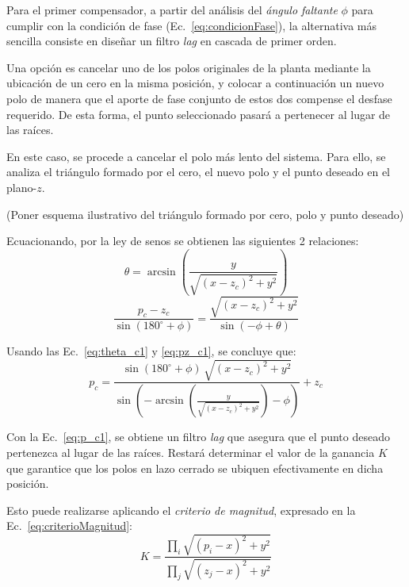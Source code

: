 Para el primer compensador, a partir del an\'alisis del \emph{ángulo faltante} $\phi$ para cumplir con la condici\'on de fase (Ec.~\eqref{eq:condicionFase}), la alternativa m\'as sencilla consiste en dise\~nar un filtro \emph{lag} en cascada de primer orden.  

Una opci\'on es cancelar uno de los polos originales de la planta mediante la ubicaci\'on de un cero en la misma posici\'on, y colocar a continuaci\'on un nuevo polo de manera que el aporte de fase conjunto de estos dos compense el desfase requerido. De esta forma, el punto seleccionado pasar\'a a pertenecer al lugar de las ra\'ices.  

En este caso, se procede a cancelar el polo m\'as lento del sistema. Para ello, se analiza el tri\'angulo formado por el cero, el nuevo polo y el punto deseado en el plano-$z$.  

(Poner esquema ilustrativo del tri\'angulo formado por cero, polo y punto deseado)  

Ecuacionando, por la ley de senos se obtienen las siguientes 2 relaciones:  
\begin{equation}
	\theta = \arcsin\!\left(\frac{y}{\sqrt{(x-z_c)^2+y^2}}\right)
	\label{eq:theta_c1}
\end{equation}
\begin{equation}
	\frac{p_c - z_c}{\sin(180^\circ+\phi)} 
	= \frac{\sqrt{(x-z_c)^2+y^2}}{\sin(-\phi+\theta)}
	\label{eq:pz_c1}
\end{equation}

Usando las Ec.~\eqref{eq:theta_c1} y \eqref{eq:pz_c1}, se concluye que:  
\begin{equation}
	p_c = 
	\frac{\sin(180^\circ+\phi)\,\sqrt{(x-z_c)^2+y^2}}
	{\sin\!\left(-\arcsin\!\left(\tfrac{y}{\sqrt{(x-z_c)^2+y^2}}\right)-\phi\right)}
	+ z_c
	\label{eq:p_c1}
\end{equation}

Con la Ec.~\eqref{eq:p_c1}, se obtiene un filtro \emph{lag} que asegura que el punto deseado pertenezca al lugar de las ra\'ices. Restar\'a determinar el valor de la ganancia $K$ que garantice que los polos en lazo cerrado se ubiquen efectivamente en dicha posici\'on.  

Esto puede realizarse aplicando el \emph{criterio de magnitud}, expresado en la Ec.~\eqref{eq:criterioMagnitud}:  
\begin{equation}
	K = \frac{\prod_i \sqrt{(p_i-x)^2+y^2}}
	{\prod_j \sqrt{(z_j-x)^2+y^2}}
	\label{eq:criterioMagnitud}
\end{equation}

